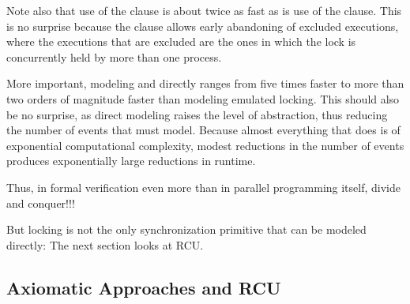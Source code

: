 {	Note also that use of the  clause is about twice
	as fast as is use of the  clause.
	This is no surprise because the  clause allows
	early abandoning of excluded executions, where the executions
	that are excluded are the ones in which the lock is concurrently
	held by more than one process.

	More important, modeling  and 
	directly ranges from five times faster to more than two orders
	of magnitude faster than modeling emulated locking.
	This should also be no surprise, as direct modeling raises
	the level of abstraction, thus reducing the number of events
	that  must model.
	Because almost everything that  does is of exponential
	computational complexity, modest reductions in the number of
	events produces exponentially large reductions in runtime.

	Thus, in formal verification even more than in parallel
	programming itself, divide and conquer!!!
}\QuickQuizEnd

But locking is not the only synchronization primitive that can be
modeled directly:
The next section looks at RCU\@.

\subsection{Axiomatic Approaches and RCU}
\label{sec:formal:Axiomatic Approaches and RCU}


